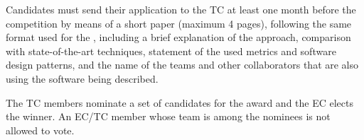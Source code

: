 Candidates must send their application to the TC at least one month before the competition by means of a short paper (maximum 4 pages), following the same format used for the \TDP{}, including a brief explanation of the approach, comparison with state-of-the-art techniques, statement of the used metrics and software design patterns, and the name of the teams and other collaborators that are also using the software being described.

The \AtHome{} TC members nominate a set of candidates for the award and the EC elects the winner.
An EC/TC member whose team is among the nominees is not allowed to vote.



